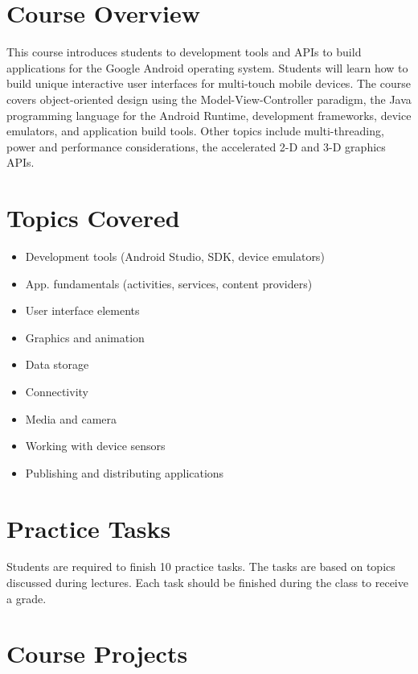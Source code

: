 \documentclass[12pt,a4paper,oneside]{article}
\begin{document}
    \section{Course Overview}

        This course introduces students to development tools and APIs to build
        applications for the Google Android operating system. Students will
        learn how to build unique interactive user interfaces for multi-touch
        mobile devices. The course covers object-oriented design using the
        Model-View-Controller paradigm, the Java programming language for the
        Android Runtime, development frameworks, device emulators, and
        application build tools. Other topics include multi-threading, power and
        performance considerations, the accelerated 2-D and 3-D graphics APIs.

    \section{Topics Covered}

        \begin{itemize}
            \item Development tools (Android Studio, SDK, device emulators)
            \item App. fundamentals (activities, services, content providers)
            \item User interface elements
            \item Graphics and animation
            \item Data storage
            \item Connectivity
            \item Media and camera
            \item Working with device sensors
            \item Publishing and distributing applications
        \end{itemize}

    \section{Practice Tasks}

        Students are required to finish 10 practice tasks. The tasks are based
        on topics discussed during lectures. Each task should be finished during
        the class to receive a grade.

    \section{Course Projects}
\end{document}
